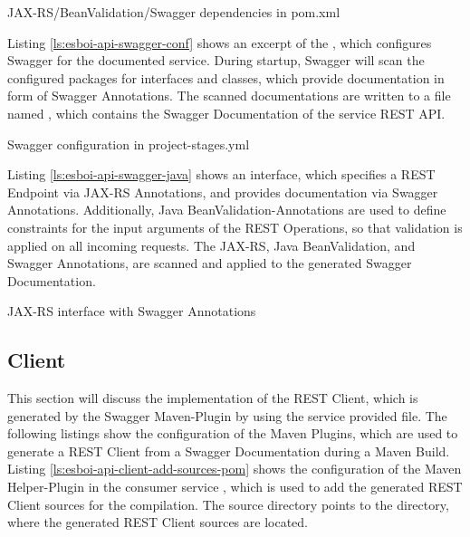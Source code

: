 \begin{listing}[h]
	\caption{JAX-RS/BeanValidation/Swagger dependencies in pom.xml}
	\label{ls:esboi-api-service-pom}
\end{listing}

Listing \vref{ls:esboi-api-swagger-conf} shows an excerpt of the  , which configures Swagger for the documented service. During startup, Swagger will scan the configured packages for interfaces and classes, which provide documentation in form of Swagger Annotations. The scanned documentations are written to a file named , which contains the Swagger Documentation of the service REST API.  
\newpage  

\begin{listing}[h]
	\caption{Swagger configuration in project-stages.yml}
	\label{ls:esboi-api-swagger-conf}
\end{listing}

Listing \vref{ls:esboi-api-swagger-java} shows an interface, which specifies a REST Endpoint via JAX-RS Annotations, and provides documentation via Swagger Annotations. Additionally, Java BeanValidation-Annotations are used to define constraints for the input arguments of the REST Operations, so that validation is applied on all incoming requests. The JAX-RS, Java BeanValidation, and Swagger Annotations, are scanned and applied to the generated Swagger Documentation.

\begin{listing}[h]
	\caption{JAX-RS interface with Swagger Annotations}
	\label{ls:esboi-api-swagger-java}
\end{listing}

\subsection{Client}
\label{sec:esbi-api-client}
This section will discuss the implementation of the REST Client, which is generated by the Swagger Maven-Plugin by using the service provided  file. The following listings show the configuration of the Maven Plugins, which are used to generate a REST Client from a Swagger Documentation during a Maven Build. \\

Listing \vref{ls:esboi-api-client-add-sources-pom} shows the configuration of the Maven Helper-Plugin in the consumer service , which is used to add the generated REST Client sources for the compilation. The source directory points to the directory, where the generated REST Client sources are located.
\newpage

